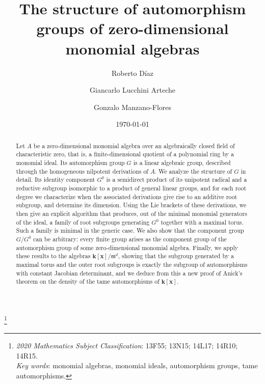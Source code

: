 \documentclass[11pt,letterpaper,reqno]{amsart}
\theoremstyle{remark}
\theoremstyle{definition}
\def\M{\mathfrak{m}}
\def\XX{\mathbf{x}}
\newcommand{\KK}[0]{\ensuremath{\mathbf{k}}}
\begin{document}
\title[Structure of monomial automorphism groups]{The structure of automorphism groups of zero-dimensional monomial algebras}


\author{Roberto D\'iaz}
\address{Departamento de Matem\'aticas, Facultad de Ciencias, Universidad de La Serena, Juan
Cisternas 1200, La Serena, Chile.}%

\author{Giancarlo Lucchini Arteche} %
\address{Departamento de Matem\'aticas, Facultad de Ciencias, Universidad de Chile, Las Palmeras 3425, \~{N}u\~{n}oa, Santiago, Chile.}

\author{Gonzalo Manzano-Flores} %
\address{Instituto de Matem\'aticas, Facultad de Ciencias, Universidad de Valpara\'iso, Gran Breta\~{n}a 1111, Valpara\'iso, Chile.}


\date{\today}

\thanks{{\it 2020 Mathematics Subject
 Classification}: 13F55; 13N15; 14L17; 14R10; 14R15.\\
 \mbox{\hspace{11pt}}{\it Key words}: monomial algebras, monomial ideals, automorphism groups, tame automorphisms.}


\begin{abstract}
Let $A$ be a zero-dimensional monomial algebra over an algebraically closed field of
characteristic zero, that is, a finite-dimensional quotient of a polynomial ring by a
monomial ideal. Its automorphism group $G$ is a linear algebraic group, described through the
homogeneous nilpotent derivations of $A$. We analyze the structure of $G$ in
detail. Its identity component $G^0$ is a semidirect product of its unipotent radical and a reductive subgroup isomorphic to a product of general linear groups, and for each root degree we characterize when the associated derivations give rise to an additive root subgroup, and determine its dimension. Using the Lie brackets of these
derivations, we then give an explicit algorithm that produces, out of the minimal monomial generators of the ideal, a family of root subgroups generating $G^0$ together with a maximal torus. Such a family is minimal in the generic case.
We also show that the component group $G/G^0$ can be arbitrary: every finite group
arises as the component group of the automorphism group of some zero-dimensional monomial algebra. Finally, we apply these results to the algebras $\KK[\XX]/\M^d$, showing that the subgroup generated by a maximal torus and the outer root subgroups is exactly the subgroup of automorphisms with constant Jacobian determinant, and we deduce from this a new proof of Anick's theorem on the density of the tame automorphisms of $\KK[\XX]$.
\end{abstract}
\maketitle
\end{document}
